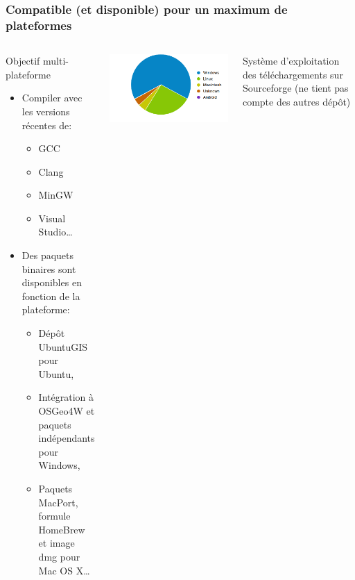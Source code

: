 \documentclass[8pt]{beamer}
\begin{document}
\begin{frame}
\frametitle{Compatible (et disponible) pour un maximum de plateformes}
\begin{columns}
\begin{block}{Objectif multi-plateforme}
\begin{itemize}
\item Compiler avec les versions récentes de:
\begin{itemize}
\item GCC
\item Clang
\item MinGW
\item Visual Studio\ldots
\end{itemize}
\item Des paquets binaires sont disponibles en fonction de la plateforme:
\begin{itemize}
\item Dépôt UbuntuGIS pour Ubuntu,
\item Intégration à OSGeo4W et paquets indépendants pour Windows,
\item Paquets MacPort, formule HomeBrew et image dmg pour Mac OS X\ldots
\end{itemize}
\end{itemize}
\end{block}
\includegraphics[width=\textwidth]{images/OTB4_download_sourceforge_os_crop.png}
\begin{center}
\tiny{Système d'exploitation des téléchargements sur Sourceforge (ne tient pas compte des autres dépôt)}
\end{center}
\end{columns}
\end{frame}
\end{document}
